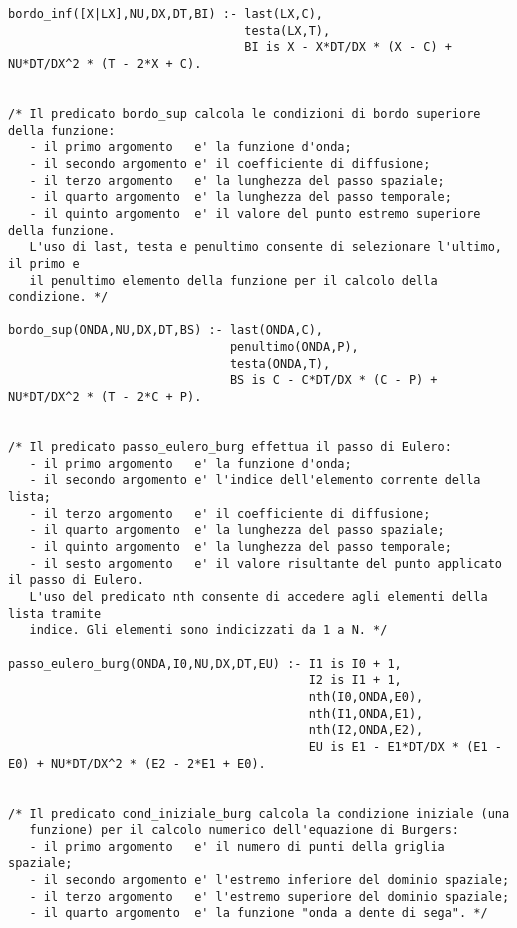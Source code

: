 \begin{verbatim}
bordo_inf([X|LX],NU,DX,DT,BI) :- last(LX,C),
                                 testa(LX,T),
                                 BI is X - X*DT/DX * (X - C) + NU*DT/DX^2 * (T - 2*X + C).


/* Il predicato bordo_sup calcola le condizioni di bordo superiore della funzione:
   - il primo argomento   e' la funzione d'onda;
   - il secondo argomento e' il coefficiente di diffusione;
   - il terzo argomento   e' la lunghezza del passo spaziale;
   - il quarto argomento  e' la lunghezza del passo temporale;
   - il quinto argomento  e' il valore del punto estremo superiore della funzione.
   L'uso di last, testa e penultimo consente di selezionare l'ultimo, il primo e
   il penultimo elemento della funzione per il calcolo della condizione. */

bordo_sup(ONDA,NU,DX,DT,BS) :- last(ONDA,C),
                               penultimo(ONDA,P),
                               testa(ONDA,T),
                               BS is C - C*DT/DX * (C - P) + NU*DT/DX^2 * (T - 2*C + P).


/* Il predicato passo_eulero_burg effettua il passo di Eulero:
   - il primo argomento   e' la funzione d'onda;
   - il secondo argomento e' l'indice dell'elemento corrente della lista;
   - il terzo argomento   e' il coefficiente di diffusione;
   - il quarto argomento  e' la lunghezza del passo spaziale;
   - il quinto argomento  e' la lunghezza del passo temporale;
   - il sesto argomento   e' il valore risultante del punto applicato il passo di Eulero.
   L'uso del predicato nth consente di accedere agli elementi della lista tramite
   indice. Gli elementi sono indicizzati da 1 a N. */

passo_eulero_burg(ONDA,I0,NU,DX,DT,EU) :- I1 is I0 + 1,
                                          I2 is I1 + 1,
                                          nth(I0,ONDA,E0),
                                          nth(I1,ONDA,E1),
                                          nth(I2,ONDA,E2),
                                          EU is E1 - E1*DT/DX * (E1 - E0) + NU*DT/DX^2 * (E2 - 2*E1 + E0).


/* Il predicato cond_iniziale_burg calcola la condizione iniziale (una 
   funzione) per il calcolo numerico dell'equazione di Burgers:
   - il primo argomento   e' il numero di punti della griglia spaziale;
   - il secondo argomento e' l'estremo inferiore del dominio spaziale;
   - il terzo argomento   e' l'estremo superiore del dominio spaziale; 
   - il quarto argomento  e' la funzione "onda a dente di sega". */


\end{verbatim}
